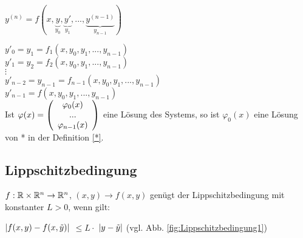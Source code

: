 $y^{(n)} = f(x,\underbrace{y}_{y_0},\underbrace{y'}_{y_1},...,\underbrace{y^{(n-1)}}_{y_{n-1}} )$

$y'_0 = y_1 = f_1(x,y_0,y_1,...,y_{n-1})$\\
$y'_1 = y_2 = f_2(x,y_0,y_1,...,y_{n-1})$\\
$\vdots$\\
$y'_{n-2} = y_{n-1} = f_{n-1}(x,y_0,y_1,...,y_{n-1})$\\
$y'_{n-1} = f(x,y_0,y_1,...,y_{n-1})$\\
Ist $\varphi(x) =   \left(  \begin{array}{c} \varphi_0(x)\\...\\\varphi_{n-1}(x)\\ \end{array}  \right)  $ eine Lösung des Systems, so ist $\varphi_0(x)$ eine Lösung von * in der Definition \ref{*}.

\subsection{Lippschitzbedingung}
\begin{defi}[Lippschitzbedingung1]
$f: \mathbb{R} \times \mathbb{R}^n \rightarrow \mathbb{R}^n$, $ (x,y) \rightarrow f(x,y)$ 
genügt der Lippschitzbedingung mit konstanter $L>0$, wenn gilt: 

\color{red}
$ \left\vert f(x,y) - f(x,\tilde{y}) \right\vert $
\color{black}
$\leq  L \cdot $
\color{blue}
$ \left\vert y-\tilde{y} \right\vert $ 
\color{black}
(vgl. Abb. \ref{fig:Lippschitzbedingung1})
\end{defi}
